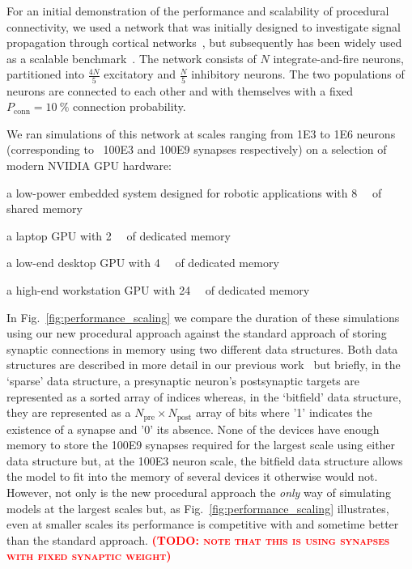 \documentclass[9pt,twocolumn,twoside,lineno]{pnas-new}
\newcommand{\todo}[1]{\textbf{\textsc{\textcolor{red}{(TODO: #1)}}}}
\begin{document}
For an initial demonstration of the performance and scalability of procedural connectivity, we used a network that was initially designed to investigate signal propagation through cortical networks~\citep{Vogels2005}, but subsequently has been widely used as a scalable benchmark~\citep{Brette2007}.
The network consists of $N$ integrate-and-fire neurons, partitioned into $\frac{4N}{5}$ excitatory and $\frac{N}{5}$ inhibitory neurons.
The two populations of neurons are connected to each other and with themselves with a fixed $P_{\text{conn}}=\SI{10}{\percent}$ connection probability.

We ran simulations of this network at scales ranging from \num{1E3} to \num{1E6} neurons (corresponding to ~\num{100E3} and \num{100E9} synapses respectively) on a selection of modern NVIDIA GPU hardware:
%
\begin{description}[noitemsep]
    \item [Jetson TX2] a low-power embedded system designed for robotic applications with \SI{8}{\giga\byte} of shared memory
    \item [Geforce MX130] a laptop GPU with \SI{2}{\giga\byte} of dedicated memory
    \item [Geforce GTX 1650] a low-end desktop GPU with \SI{4}{\giga\byte} of dedicated memory
    \item [Titan RTX] a high-end workstation GPU with \SI{24}{\giga\byte} of dedicated memory
\end{description}
%
In Fig.~\ref{fig:performance_scaling} we compare the duration of these simulations using our new procedural approach against the standard approach of storing synaptic connections in memory using two different data structures.
Both data structures are described in more detail in our previous work~\citep{Knight2018} but briefly, in the `sparse' data structure, a presynaptic neuron's postsynaptic targets are represented as a sorted array of indices whereas, in the `bitfield' data structure, they are represented as a $N_{\text{pre}} \times N_{\text{post}}$ array of bits where '1' indicates the existence of a synapse and '0' its absence.
None of the devices have enough memory to store the \num{100E9} synapses required for the largest scale using either data structure but, at the \num{100E3} neuron scale, the bitfield data structure allows the model to fit into the memory of several devices it otherwise would not.
However, not only is the new procedural approach the \emph{only} way of simulating models at the largest scales but, as Fig.~\ref{fig:performance_scaling} illustrates, even at smaller scales its performance is competitive with and sometime better than the standard approach.
\todo{note that this is using synapses with fixed synaptic weight}
\end{document}
